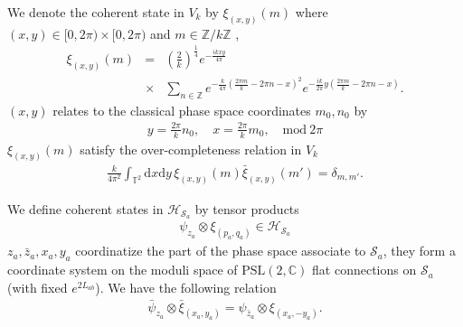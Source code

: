 \documentclass[aps,prd,notitlepage,nofootinbib,superscriptaddress,groupedaddress,twocolumn]{revtex4-1}
\newcommand{\PSlc}{\mathrm{PSL}(2,\mathbb{C})}
\def\be{\begin{eqnarray}}
\def\ee{\end{eqnarray}}
\newcommand{\ch}{\mathcal H}
\newcommand{\cs}{\mathcal S}
\newcommand{\rmd}{\mathrm d}
\newcommand{\lt}{\left}
\newcommand{\rt}{\right}
\newcommand{\act}{\rhd}
\begin{document}
We denote the coherent state in $V_k$ by $\xi_{(x,y)}(m)$ where $(x,y)\in[0,2\pi)\times[0,2\pi)$ and $m\in\mathbb{Z}/k\mathbb{Z}$ \cite{gazeau2009coherent},
\be 
\xi_{(x,y)}(m)&=&\lt({\frac{2}{k}}\rt)^{\frac{1}{4}} e^{-\frac{i k x y}{4 \pi }} \label{xixym}\\
&\times&\sum_{n\in\mathbb{Z}}e^{-\frac{k }{4 \pi }\left(\frac{2 \pi  m}{k}-2 \pi  n-x\right)^2} e^{-\frac{i k  }{2 \pi }y\left(\frac{2 \pi  m}{k}-2 \pi  n-x\right)}.\nonumber%
\ee
$(x,y)$ relates to the classical phase space coordinates $m_0,n_0$ by
\be
y=\frac{2\pi}{k}n_0,\quad x=\frac{2\pi}{k}m_0,\quad \text{mod}\ 2\pi\label{xymn}
\ee
$\xi_{(x,y)}(m)$ satisfy the over-completeness relation in $V_k$
\be
\frac{k}{4\pi^2}\int_{\mathbb{T}^2}\rmd x\rmd y\,\xi_{(x,y)}(m)\bar{\xi}_{(x,y)}(m')=\delta_{m,m'}.
\ee


We define coherent states in $\ch_{\cs_a}$ by tensor products
\be
\psi_{z_a}\otimes\xi_{(p_a,q_a)} \in \ch_{\cs_a}
\ee
$z_a,\bar{z}_a,x_a,y_a$ coordinatize the part of the phase space associate to $\cs_a$, they form a coordinate system on the moduli space of $\PSlc$ flat connections on $\cs_a$ (with fixed $e^{2L_{ab}}$). We have the following relation 
\be
\bar{\psi}_{z_a}\otimes\bar{\xi}_{(x_a,y_a)}=\psi_{\bar{z}_a}\otimes\xi_{(x_a,-y_a)}.\label{complexcc000}
\ee


\end{document}
